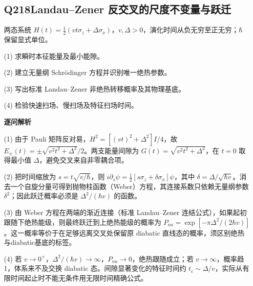
\subsection*{Q218\quad Landau–Zener 反交叉的尺度不变量与跃迁}

两态系统 $H(t)=\frac12(vt\sigma_z+\Delta\sigma_x)$，$v,\Delta>0$，演化时间从负无穷至正无穷；$\hbar$ 保留显式单位。

(1) 求瞬时本征能量及最小能隙。

(2) 建立无量纲 Schrödinger 方程并识别唯一绝热参数。

(3) 写出标准 Landau–Zener 非绝热转移概率及其物理基底。

(4) 检验快速扫场、慢扫场及特征扫场时间。

\par\textbf{逐问解析}

(1) 由于 Pauli 矩阵反对易，$H^2=[(vt)^2+\Delta^2]I/4$，故 $E_\pm(t)=\pm\sqrt{v^2t^2+\Delta^2}/2$。两支能量间隙为 $G(t)=\sqrt{v^2t^2+\Delta^2}$，在 $t=0$ 取得最小值 $\Delta$，避免交叉来自非零耦合项。

(2) 把时间缩放为 $s=t\sqrt{v/\hbar}$，则 $i\partial_s\psi=\frac12[s\sigma_z+\delta\sigma_x]\psi$，其中 $\delta=\Delta/\sqrt{\hbar v}$。消去一个自旋分量可得到抛物柱函数（Weber）方程，其连接系数只依赖无量纲参数 $\delta^2$；因此跃迁概率必须是 $\Delta^2/(\hbar v)$ 的函数。

(3) 由 Weber 方程在两端的渐近连接（标准 Landau–Zener 连结公式），如果起初跟随下绝热能级，则最终跃迁到上绝热能级的概率为 $P_{na}=\exp[-\pi\Delta^2/(2\hbar v)]$。这一概率等价于在足够远离交叉处保留原 diabatic 直线态的概率，须区别绝热与diabatic基底的标签。

(4) 若 $v\to0^+$，$\Delta^2/(\hbar v)\to\infty$，$P_{na}\to0$，绝热跟随成立；若 $v\to\infty$，概率趋1，体系来不及交换 diabatic 态。间隙显著变化的特征时间约 $t_c\sim\Delta/v$，实际从有限时间起止时不能无条件用无限时间精确公式。

\par\medskip

